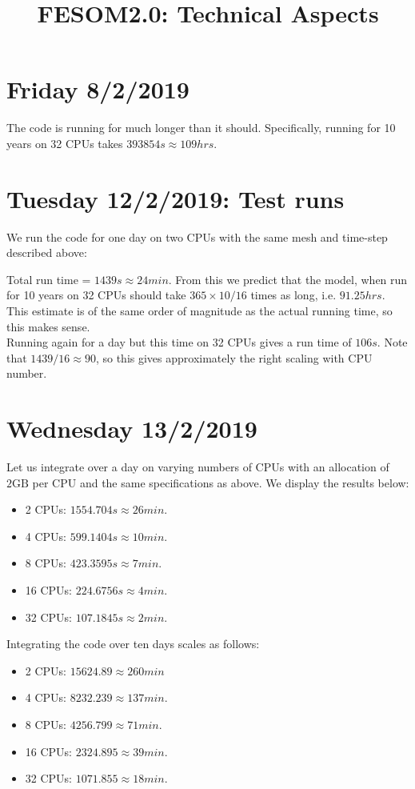 \documentclass[10pt]{article}
\begin{document}
\title{FESOM2.0: Technical Aspects}
\date{}
\maketitle
\section*{Friday 8/2/2019}
The code is running for much longer than it should. 
Specifically, running for 10 years on 32 CPUs takes $393854s \approx 109hrs$.
\section*{Tuesday 12/2/2019: Test runs}

We run the code for one day on two CPUs with the same mesh and time-step described above:

Total run time = $1439s \approx 24min$. From this we predict that the model, when run for 10 years on 32 CPUs should take $365\times 10/16$ times as long, i.e. $91.25 hrs$. This estimate is of the same order of magnitude as the actual running time, so this makes sense.  \\
\linebreak
Running again for a day but this time on 32 CPUs gives a run time of $106s$. Note that $1439/16 \approx 90$, so this gives approximately the right scaling with CPU number.  

\section*{Wednesday 13/2/2019}

Let us integrate over a day on varying numbers of CPUs with an allocation of $2\text{GB}$ per CPU and the same specifications as above. We display the results below:

\begin{itemize}
\item 2 CPUs:  $1554.704s \approx 26min$. 
\item 4 CPUs: $599.1404s \approx 10min$.
\item 8 CPUs: $423.3595s \approx 7min$.
\item 16 CPUs: $224.6756s \approx 4min$.
\item 32 CPUs: $107.1845s \approx 2min$.
\end{itemize}

Integrating the code over ten days scales as follows:
\begin{itemize}
\item 2 CPUs:  $15624.89\approx 260min$
\item 4 CPUs: $8232.239\approx 137min$.
\item 8 CPUs: $4256.799\approx 71min$.
\item 16 CPUs: $2324.895\approx 39min$.
\item 32 CPUs: $1071.855\approx 18min$.
\end{itemize}
\end{document}
